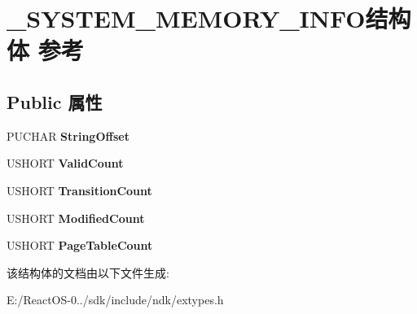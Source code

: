 \hypertarget{struct___s_y_s_t_e_m___m_e_m_o_r_y___i_n_f_o}{}\section{\+\_\+\+S\+Y\+S\+T\+E\+M\+\_\+\+M\+E\+M\+O\+R\+Y\+\_\+\+I\+N\+F\+O结构体 参考}
\label{struct___s_y_s_t_e_m___m_e_m_o_r_y___i_n_f_o}
\subsection*{Public 属性}
\begin{DoxyCompactItemize}
\item 
\mbox{\label{struct___s_y_s_t_e_m___m_e_m_o_r_y___i_n_f_o_a1bd83b91b612709dfa88f99a49819494}} 
P\+U\+C\+H\+AR {\bfseries String\+Offset}
\item 
\mbox{\label{struct___s_y_s_t_e_m___m_e_m_o_r_y___i_n_f_o_a18d15c21a68041980f36583800df6445}} 
U\+S\+H\+O\+RT {\bfseries Valid\+Count}
\item 
\mbox{\label{struct___s_y_s_t_e_m___m_e_m_o_r_y___i_n_f_o_a2867235740b8d8da5074866e20e9c324}} 
U\+S\+H\+O\+RT {\bfseries Transition\+Count}
\item 
\mbox{\label{struct___s_y_s_t_e_m___m_e_m_o_r_y___i_n_f_o_a6d6fbf1e9fa147af85cd98373d1da696}} 
U\+S\+H\+O\+RT {\bfseries Modified\+Count}
\item 
\mbox{\label{struct___s_y_s_t_e_m___m_e_m_o_r_y___i_n_f_o_a245c9457625a9f4507c3947a3726a231}} 
U\+S\+H\+O\+RT {\bfseries Page\+Table\+Count}
\end{DoxyCompactItemize}


该结构体的文档由以下文件生成\+:\begin{DoxyCompactItemize}
\item 
E\+:/\+React\+O\+S-\/0../sdk/include/ndk/extypes.\+h\end{DoxyCompactItemize}
